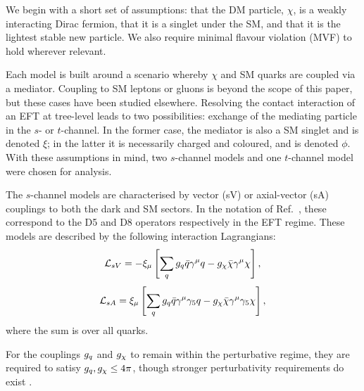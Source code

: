 We begin with a short set of assumptions: that the DM particle, $\chi$, is a weakly interacting Dirac fermion, that it is a singlet under the SM, and that it is the lightest stable new particle. We also require minimal flavour violation (MVF) to hold wherever relevant.

Each model is built around a scenario whereby $\chi$ and SM quarks are coupled via a mediator. Coupling to SM leptons \cite{} or gluons \cite{} is beyond the scope of this paper, but these cases have been studied elsewhere. Resolving the contact interaction of an EFT at tree-level leads to two possibilities: exchange of the mediating particle in the $s$- or $t$-channel. In the former case, the mediator is also a SM singlet and is denoted $\xi$; in the latter it is necessarily charged and coloured, and is denoted $\phi$. With these assumptions in mind, two $s$-channel models and one $t$-channel model were chosen for analysis.

The $s$-channel models are characterised by vector (sV) or axial-vector (sA) couplings to both the dark and SM sectors. In the notation of Ref.~\cite{DMCons2}, these correspond to the D5 and D8 operators respectively in the EFT regime. These models are described by the following interaction Lagrangians:
\begin{equation}
\label{L_int_sV}
\mathcal{L}_{sV} = - \xi_{\mu}\left[ \sum\limits_{q} g_q\bar{q}\gamma^{\mu}q - g_{\chi}\bar{\chi}\gamma^{\mu}\chi\right],
\end{equation}
\begin{equation}
\label{L_int_sA}
\mathcal{L}_{sA} =  \xi_{\mu}\left[\sum\limits_{q} g_q\bar{q}\gamma^{\mu}\gamma_{5}q - g_{\chi}\bar{\chi}\gamma^{\mu}\gamma_{5}\chi\right],
\end{equation}
where the sum is over all quarks.

For the couplings $g_q$ and $g_{\chi}$ to remain within the perturbative regime, they are required to satisy $g_q,g_{\chi} \leq 4\pi$, though stronger perturbativity requirements do exist \cite{ValidEFT}.

